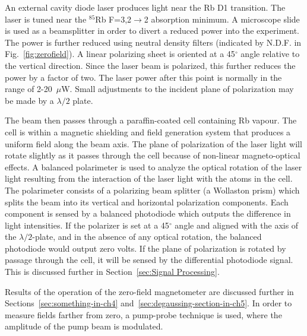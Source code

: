 An external cavity diode laser produces light near the Rb D1
transition.  The laser is tuned near the $^{85}$Rb F=3,2$\rightarrow$2
absorption minimum.  A microscope slide is used as a beamsplitter in
order to divert a reduced power into the experiment.  The power is
further reduced using neutral density filters (indicated by N.D.F. in
Fig.~\ref{fig:zerofield}).  A linear polarizing sheet is oriented at a
45$^\circ$ angle relative to the vertical direction.  Since the laser
beam is polarized, this further reduces the power by a factor of
two. The laser power after this point is normally in the range of
2-20~$\mu$W.  Small adjustments to the incident plane of polarization
may be made by a $\lambda/2$ plate.

The beam then passes through a paraffin-coated cell containing Rb
vapour.  The cell is within a magnetic shielding and field generation
system that produces a uniform field along the beam axis.  The plane
of polarization of the laser light will rotate slightly as it passes
through the cell because of non-linear magneto-optical effects.  A
balanced polarimeter is used to analyze the optical rotation of the
laser light resulting from the interaction of the laser light with the
atoms in the cell.  The polarimeter consists of a polarizing beam
splitter (a Wollaston prism) which splits the beam into its vertical
and horizontal polarization components.  Each component is sensed by a
balanced photodiode which outputs the difference in light intensities.
If the polarizer is set at a 45$^\circ$ angle and aligned with the
axis of the $\lambda/2$-plate, and in the absence of any optical
rotation, the balanced photodiode would output zero volts.  If the
plane of polarization is rotated by passage through the cell, it will
be sensed by the differential photodiode signal.  This is discussed
further in Section~\ref{sec:Signal Processing}.

Results of the operation of the zero-field magnetometer are discussed
further in Sections~\ref{sec:something-in-ch4}
and~\ref{sec:degaussing-section-in-ch5}.  In order to measure fields
farther from zero, a pump-probe technique is used, where the amplitude
of the pump beam is modulated.

